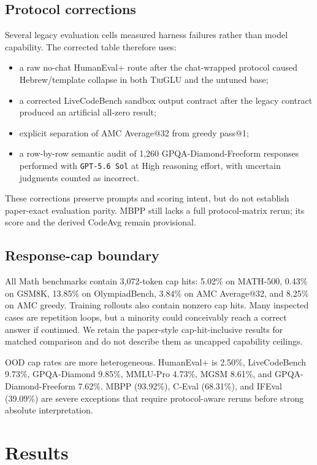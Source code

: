 \documentclass[10pt]{article}
\newcommand{\TriGLU}{\textsc{TriGLU}}
\begin{document}
\subsection{Protocol corrections}

Several legacy evaluation cells measured harness failures rather than model
capability.  The corrected table therefore uses:
\begin{itemize}
  \item a raw no-chat HumanEval+ route after the chat-wrapped protocol caused
        Hebrew/template collapse in both \TriGLU{} and the untuned base;
  \item a corrected LiveCodeBench sandbox output contract after the legacy
        contract produced an artificial all-zero result;
  \item explicit separation of AMC Average@32 from greedy pass@1;
  \item a row-by-row semantic audit of 1,260 GPQA-Diamond-Freeform responses
        performed with \texttt{GPT-5.6 Sol} at High reasoning effort, with
        uncertain judgments counted as incorrect.
\end{itemize}

These corrections preserve prompts and scoring intent, but do not establish
paper-exact evaluation parity.  MBPP still lacks a full protocol-matrix rerun;
its score and the derived CodeAvg remain provisional.

\subsection{Response-cap boundary}

All Math benchmarks contain 3,072-token cap hits: 5.02\% on MATH-500, 0.43\%
on GSM8K, 13.85\% on OlympiadBench, 3.84\% on AMC Average@32, and 8.25\% on
AMC greedy.  Training rollouts also contain nonzero cap hits.  Many inspected
cases are repetition loops, but a minority could conceivably reach a correct
answer if continued.  We retain the paper-style cap-hit-inclusive results for
matched comparison and do not describe them as uncapped capability ceilings.

OOD cap rates are more heterogeneous.  HumanEval+ is 2.50\%, LiveCodeBench
9.73\%, GPQA-Diamond 9.85\%, MMLU-Pro 4.73\%, MGSM 8.61\%, and
GPQA-Diamond-Freeform 7.62\%.  MBPP (93.92\%), C-Eval (68.31\%), and IFEval
(39.09\%) are severe exceptions that require protocol-aware reruns before
strong absolute interpretation.

\section{Results}
\end{document}
